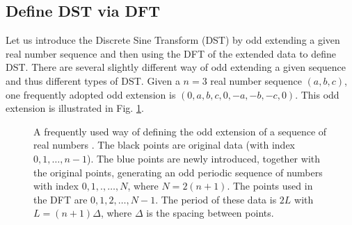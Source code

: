 \documentclass{article}
\begin{document}
\subsection{Define DST via DFT}

Let us introduce the Discrete Sine Transform (DST) by odd extending a given
real number sequence and then using the DFT of the extended data to define
DST. There are several slightly different way of odd extending a given
sequence and thus different types of DST. Given a $n = 3$ real number sequence
$(a, b, c)$, one frequently adopted odd extension is $(0, a, b, c, 0, - a, -
b, - c, 0)$. This odd extension is illustrated in Fig. \ref{18-1-11-e1}.

\begin{figure}[h]
  \caption{\label{18-1-11-e1}A frequently used way of defining the odd
  extension of a sequence of real numbers . The black points are original data
  (with index $0, 1, \ldots, n - 1$). The blue points are newly introduced,
  together with the original points, generating an odd periodic sequence of
  numbers with index $0, 1, ., \ldots, N$, where $N = 2 (n + 1)$. The points
  used in the DFT are $0, 1, 2, \ldots, N - 1$. The period of these data is $2
  L$ with $L = (n + 1) \Delta$, where $\Delta$ is the spacing between points.}
\end{figure}
\end{document}

